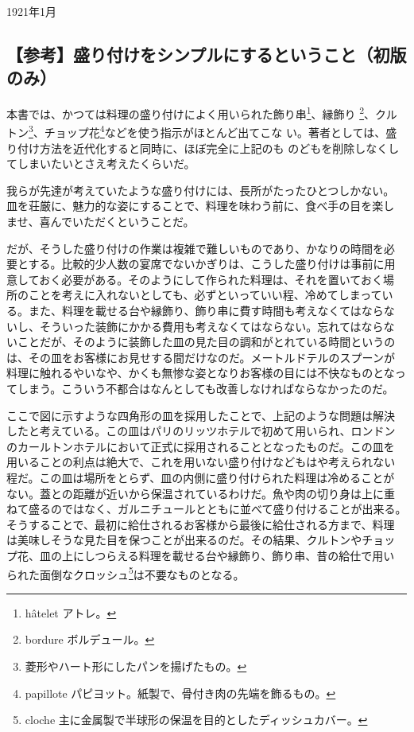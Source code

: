\begin{flushright}
1921年1月
\end{flushright}

\newpage\small

\hypertarget{ux53c2ux8003ux76dbux308aux4ed8ux3051ux3092ux30b7ux30f3ux30d7ux30ebux306bux3059ux308bux3068ux3044ux3046ux3053ux3068ux521dux7248ux306eux307f}{%
\subsection{【参考】盛り付けをシンプルにするということ（初版のみ）}\label{ux53c2ux8003ux76dbux308aux4ed8ux3051ux3092ux30b7ux30f3ux30d7ux30ebux306bux3059ux308bux3068ux3044ux3046ux3053ux3068ux521dux7248ux306eux307f}}

本書では、かつては料理の盛り付けによく用いられた飾り串\footnote{hâtelet
  アトレ。}、縁飾り \footnote{bordure ボルデュール。}、クルトン\footnote{菱形やハート形にしたパンを揚げたもの。}、チョップ花\footnote{papillote
  パピヨット。紙製で、骨付き肉の先端を飾るもの。}などを使う指示がほとんど出てこな
い。著者としては、盛り付け方法を近代化すると同時に、ほぼ完全に上記のも
のどもを削除しなくしてしまいたいとさえ考えたくらいだ。

我らが先達が考えていたような盛り付けには、長所がたったひとつしかない。
皿を荘厳に、魅力的な姿にすることで、料理を味わう前に、食べ手の目を楽し
ませ、喜んでいただくということだ。

だが、そうした盛り付けの作業は複雑で難しいものであり、かなりの時間を必
要とする。比較的少人数の宴席でないかぎりは、こうした盛り付けは事前に用
意しておく必要がある。そのようにして作られた料理は、それを置いておく場
所のことを考えに入れないとしても、必ずといっていい程、冷めてしまってい
る。また、料理を載せる台や縁飾り、飾り串に費す時間も考えなくてはならな
いし、そういった装飾にかかる費用も考えなくてはならない。忘れてはならな
いことだが、そのように装飾した皿の見た目の調和がとれている時間というの
は、その皿をお客様にお見せする間だけなのだ。メートルドテルのスプーンが
料理に触れるやいなや、かくも無惨な姿となりお客様の目には不快なものとなっ
てしまう。こういう不都合はなんとしても改善しなければならなかったのだ。

ここで図に示すような四角形の皿を採用したことで、上記のような問題は解決
したと考えている。この皿はパリのリッツホテルで初めて用いられ、ロンドン
のカールトンホテルにおいて正式に採用されることとなったものだ。この皿を
用いることの利点は絶大で、これを用いない盛り付けなどもはや考えられない
程だ。この皿は場所をとらず、皿の内側に盛り付けられた料理は冷めることが
ない。蓋との距離が近いから保温されているわけだ。魚や肉の切り身は上に重
ねて盛るのではなく、ガルニチュールとともに並べて盛り付けることが出来る。
そうすることで、最初に給仕されるお客様から最後に給仕される方まで、料理
は美味しそうな見た目を保つことが出来るのだ。その結果、クルトンやチョッ
プ花、皿の上にしつらえる料理を載せる台や縁飾り、飾り串、昔の給仕で用い
られた面倒なクロッシュ\footnote{cloche
  主に金属製で半球形の保温を目的としたディッシュカバー。}は不要なものとなる。

